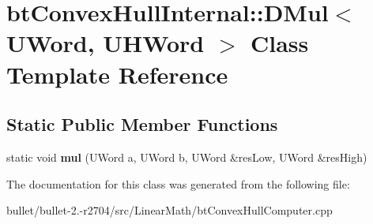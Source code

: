 \hypertarget{classbt_convex_hull_internal_1_1_d_mul}{\section{bt\+Convex\+Hull\+Internal\+:\+:D\+Mul$<$ U\+Word, U\+H\+Word $>$ Class Template Reference}
\label{classbt_convex_hull_internal_1_1_d_mul}
}
\subsection*{Static Public Member Functions}
\begin{DoxyCompactItemize}
\item 
\hypertarget{classbt_convex_hull_internal_1_1_d_mul_a7e5a2767d9b01e7ab224381c029b2cbb}{static void {\bfseries mul} (U\+Word a, U\+Word b, U\+Word \&res\+Low, U\+Word \&res\+High)}\label{classbt_convex_hull_internal_1_1_d_mul_a7e5a2767d9b01e7ab224381c029b2cbb}

\end{DoxyCompactItemize}


The documentation for this class was generated from the following file\+:\begin{DoxyCompactItemize}
\item 
bullet/bullet-\/2.-\/r2704/src/\+Linear\+Math/bt\+Convex\+Hull\+Computer.\+cpp\end{DoxyCompactItemize}
